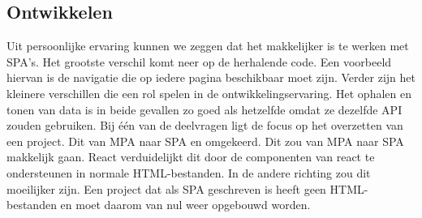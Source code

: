 \documentclass{hogent-article}
\begin{document}
\subsection{Ontwikkelen}
Uit persoonlijke ervaring kunnen we zeggen dat het makkelijker is te werken met SPA's.
Het grootste verschil komt neer op de herhalende code.
Een voorbeeld hiervan is de navigatie die op iedere pagina beschikbaar moet zijn.
Verder zijn het kleinere verschillen die een rol spelen in de ontwikkelingservaring.
Het ophalen en tonen van data is in beide gevallen zo goed als hetzelfde omdat ze dezelfde API zouden gebruiken.
Bij één van de deelvragen ligt de focus op het overzetten van een project.
Dit van MPA naar SPA en omgekeerd.
Dit zou van MPA naar SPA makkelijk gaan.
React verduidelijkt dit door de componenten van react te ondersteunen in normale HTML-bestanden.
In de andere richting zou dit moeilijker zijn.
Een project dat als SPA geschreven is heeft geen HTML-bestanden en moet daarom van nul weer opgebouwd worden.

\printbibliography[heading=bibintoc]

\end{document}

